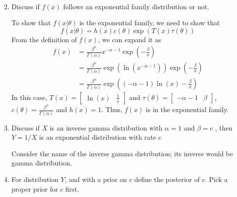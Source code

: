 \documentclass{article}
\begin{document}
\begin{enumerate}
\begin{sol}
\begin{align*}
    \end{align*}
    \end{sol}
    \color{black}
    \item Discuss if $f(x)$ follows an exponential family distribution or not. 
    \color{blue}
    \begin{sol}
    To show that $f(x|\theta)$ is the exponential family, we need to show that
    $$f(x|\theta) = h(x)c(\theta) \exp(T(x)\tau(\theta))$$
    From the definition of $f(x)$, we can expand it as
    \begin{align*}
        f(x) &= \frac{\beta^\alpha}{\Gamma(\alpha)} x^{-\alpha-1}\exp\left(-\frac{\beta}{x}\right) \\
        &= \frac{\beta^\alpha}{\Gamma(\alpha)}\exp\left(\ln(x^{-\alpha-1})\right)\exp\left(-\frac{\beta}{x}\right)\\
        &=  \frac{\beta^\alpha}{\Gamma(\alpha)} \exp\left((-\alpha-1)\ln(x) - \frac{\beta}{x}\right)
    \end{align*}
    In this case, $T(x) = \begin{bmatrix}\ln(x) & \frac{1}{x}\end{bmatrix}$ and $\tau(\theta) = \begin{bmatrix}
        -\alpha - 1 & \beta
    \end{bmatrix}$, $c(\theta) =\frac{\beta^\alpha}{\Gamma(\alpha)}$ and $h(x) = 1$. Thus, $f(x)$ is in the exponential family.
    \end{sol}
    \color{black}
    \item Discuss if $X$ is an inverse gamma distribution with $\alpha =1$  and $\beta =c$ , then $Y=1/X$ is an exponential distribution with rate $c$ 
    \color{blue}
    \begin{sol}
        Consider the name of the inverse gamma distribution; its inverse would be gamma distribution.
    \end{sol}
    \color{black}
    \item For distribution $Y$, and with a prior on $c$ define the posterior of $c$. Pick a proper prior for $c$ 
first. 
\end{enumerate}
\end{document}
